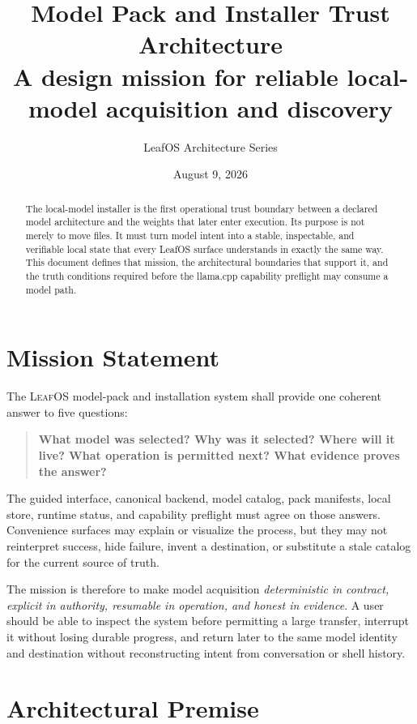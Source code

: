 \documentclass[11pt]{article}
\title{\textbf{\LeafOS{} Model Pack and Installer Trust Architecture}\\
\large A design mission for reliable local-model acquisition and discovery}
\author{LeafOS Architecture Series}
\date{August 9, 2026}
\newcommand{\LeafOS}{\textsc{LeafOS}}
\begin{document}
\maketitle

\begin{abstract}
The local-model installer is the first operational trust boundary between a
declared model architecture and the weights that later enter execution. Its
purpose is not merely to move files. It must turn model intent into a stable,
inspectable, and verifiable local state that every LeafOS surface understands
in exactly the same way. This document defines that mission, the architectural
boundaries that support it, and the truth conditions required before the
llama.cpp capability preflight may consume a model path.
\end{abstract}

\section{Mission Statement}

The \LeafOS{} model-pack and installation system shall provide one coherent
answer to five questions:

\begin{quote}
\color{leafgreen}\bfseries
What model was selected?  Why was it selected?  Where will it live?  What
operation is permitted next?  What evidence proves the answer?
\end{quote}

The guided interface, canonical backend, model catalog, pack manifests, local
store, runtime status, and capability preflight must agree on those answers.
Convenience surfaces may explain or visualize the process, but they may not
reinterpret success, hide failure, invent a destination, or substitute a stale
catalog for the current source of truth.

The mission is therefore to make model acquisition \emph{deterministic in
contract, explicit in authority, resumable in operation, and honest in
evidence}. A user should be able to inspect the system before permitting a
large transfer, interrupt it without losing durable progress, and return later
to the same model identity and destination without reconstructing intent from
conversation or shell history.

\section{Architectural Premise}
\end{document}
